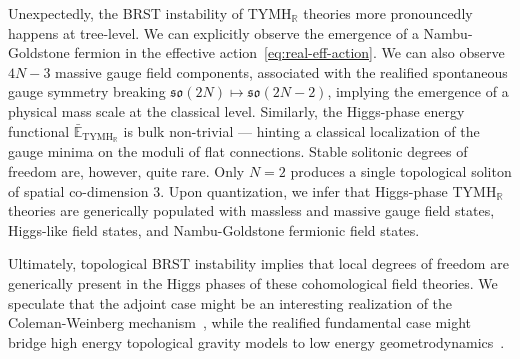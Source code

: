 \documentclass[../main.tex]{subfiles}
\begin{document}
Unexpectedly, the BRST instability of TYMH$_{\mathbb{R}}$ theories more pronouncedly happens at tree-level. We can explicitly observe the emergence of a Nambu-Goldstone fermion in the effective action~\eqref{eq:real-eff-action}. We can also observe $4N-3$ massive gauge field components, associated with the realified spontaneous gauge symmetry breaking $\mathfrak{so}(2N) \mapsto \mathfrak{so}(2N-2)$, implying the emergence of a physical mass scale at the classical level. Similarly, the Higgs-phase energy functional $\bar{\mathbb{E}}_{\text{TYMH}_{\mathbb{R}}}$ is bulk non-trivial --- hinting a classical localization of the gauge minima on the moduli of flat connections. Stable solitonic degrees of freedom are, however, quite rare. Only $N=2$ produces a single topological soliton of spatial co-dimension 3. Upon quantization, we infer that Higgs-phase TYMH$_{\mathbb{R}}$ theories are generically populated with massless and massive gauge field states, Higgs-like field states, and Nambu-Goldstone fermionic field states.

Ultimately, topological BRST instability implies that local degrees of freedom are generically present in the Higgs phases of these cohomological field theories. We speculate that the adjoint case might be an interesting realization of the Coleman-Weinberg mechanism~\cite{coleman1973a}, while the realified fundamental case might bridge high energy topological gravity models to low energy geometrodynamics~\cite{sako1997a,mielke2011a,alexander2016a,sadovski2017a,chengzheng2017a,agrawal2020a,edery2023a,tianyao2023a,kehagias2021a,raitio2024a,sadovski2025a}.
\end{document}
